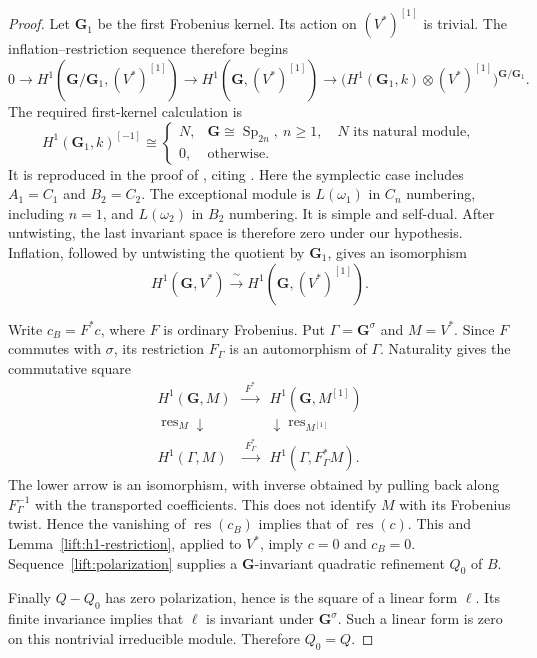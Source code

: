 \begin{proof}
Let $\mathbf G_1$ be the first Frobenius kernel.  Its action on
$(V^*)^{[1]}$ is trivial.  The inflation--restriction sequence therefore
begins
\[
 0\longrightarrow H^1(\mathbf G/\mathbf G_1,(V^*)^{[1]})
 \longrightarrow H^1(\mathbf G,(V^*)^{[1]})
 \longrightarrow
 \bigl(H^1(\mathbf G_1,k)\otimes(V^*)^{[1]}\bigr)
       ^{\mathbf G/\mathbf G_1}.
\]
The required first-kernel calculation is
\[
 H^1(\mathbf G_1,k)^{[-1]}\cong
 \begin{cases}
 N,&\mathbf G\cong\operatorname{Sp}_{2n},\ n\geq1,
       \quad N\text{ its natural module},\\
 0,&\text{otherwise}.
 \end{cases}
\]
It is reproduced in the proof of
\cite[Proposition~7.1, p.~411]{GaribaldiNakano2016}, citing
\cite[Theorem~3.1(C)(a),(f)]{BNP2004}.  Here the symplectic case includes
$A_1=C_1$ and $B_2=C_2$.  The exceptional module is $L(\omega_1)$ in
$C_n$ numbering, including $n=1$, and $L(\omega_2)$ in $B_2$
numbering.  It is simple and self-dual.  After untwisting, the last invariant space
is therefore zero under our hypothesis.  Inflation, followed by
untwisting the quotient by $\mathbf G_1$, gives an isomorphism
\[
 H^1(\mathbf G,V^*)\xrightarrow{\ \sim\ }
 H^1(\mathbf G,(V^*)^{[1]}).
\]

Write $c_B=F^*c$, where $F$ is ordinary Frobenius.  Put
$\Gamma=\mathbf G^\sigma$ and $M=V^*$.  Since $F$ commutes with
$\sigma$, its restriction $F_\Gamma$ is an automorphism of $\Gamma$.
Naturality gives the commutative square
\[
\begin{array}{ccc}
 H^1(\mathbf G,M)&\xrightarrow{\ F^*\ }&H^1(\mathbf G,M^{[1]})\\
 \operatorname{res}_M\downarrow&&\downarrow\operatorname{res}_{M^{[1]}}\\
 H^1(\Gamma,M)&\xrightarrow{\ F_\Gamma^*\ }&
 H^1(\Gamma,F_\Gamma^*M).
\end{array}
\]
The lower arrow is an isomorphism, with inverse obtained by pulling
back along $F_\Gamma^{-1}$ with the transported coefficients.
This does not identify $M$ with its Frobenius twist.  Hence the
vanishing of $\operatorname{res}(c_B)$ implies that of
$\operatorname{res}(c)$.  This and
Lemma~\ref{lift:h1-restriction}, applied to $V^*$, imply $c=0$ and
$c_B=0$.  Sequence~\eqref{lift:polarization} supplies a
$\mathbf G$-invariant quadratic refinement $Q_0$ of $B$.

Finally $Q-Q_0$ has zero polarization, hence is the square of a linear
form $\ell$.  Its finite invariance implies that $\ell$ is invariant
under $\mathbf G^\sigma$.  Such a linear form is zero on this
nontrivial irreducible module.  Therefore $Q_0=Q$.
\end{proof}


